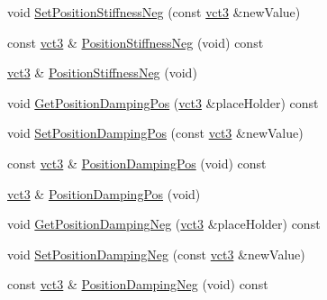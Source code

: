 \begin{DoxyCompactItemize}
\item 
void \hyperlink{classprm_fixture_gain_cartesian_set_af20086c9ad3e9302eee26f8021f1000e}{Set\-Position\-Stiffness\-Neg} (const \hyperlink{vct_fixed_size_vector_types_8h_a3af82acdbf4eeb73c551909240b106ea}{vct3} \&new\-Value)
\item 
const \hyperlink{vct_fixed_size_vector_types_8h_a3af82acdbf4eeb73c551909240b106ea}{vct3} \& \hyperlink{classprm_fixture_gain_cartesian_set_a891d31388bf8192eaac44ceecd5d8030}{Position\-Stiffness\-Neg} (void) const 
\item 
\hyperlink{vct_fixed_size_vector_types_8h_a3af82acdbf4eeb73c551909240b106ea}{vct3} \& \hyperlink{classprm_fixture_gain_cartesian_set_a1986f1b9acb79893d9d21b301fac40cf}{Position\-Stiffness\-Neg} (void)
\item 
void \hyperlink{classprm_fixture_gain_cartesian_set_a810c5926cd3f1d5cdb0fbe14e7c1f055}{Get\-Position\-Damping\-Pos} (\hyperlink{vct_fixed_size_vector_types_8h_a3af82acdbf4eeb73c551909240b106ea}{vct3} \&place\-Holder) const 
\item 
void \hyperlink{classprm_fixture_gain_cartesian_set_a7bf9ae58df70a804536fb37d03e41a5b}{Set\-Position\-Damping\-Pos} (const \hyperlink{vct_fixed_size_vector_types_8h_a3af82acdbf4eeb73c551909240b106ea}{vct3} \&new\-Value)
\item 
const \hyperlink{vct_fixed_size_vector_types_8h_a3af82acdbf4eeb73c551909240b106ea}{vct3} \& \hyperlink{classprm_fixture_gain_cartesian_set_a5f22007d55b6ebe8c7eb206fda12cc2d}{Position\-Damping\-Pos} (void) const 
\item 
\hyperlink{vct_fixed_size_vector_types_8h_a3af82acdbf4eeb73c551909240b106ea}{vct3} \& \hyperlink{classprm_fixture_gain_cartesian_set_a50b28ac97613f8d8d49c47d218c9c6f1}{Position\-Damping\-Pos} (void)
\item 
void \hyperlink{classprm_fixture_gain_cartesian_set_a67085d00946a53c8f7fb878d57f0a901}{Get\-Position\-Damping\-Neg} (\hyperlink{vct_fixed_size_vector_types_8h_a3af82acdbf4eeb73c551909240b106ea}{vct3} \&place\-Holder) const 
\item 
void \hyperlink{classprm_fixture_gain_cartesian_set_a944212c1d502b5c5109b892c9bfdfba3}{Set\-Position\-Damping\-Neg} (const \hyperlink{vct_fixed_size_vector_types_8h_a3af82acdbf4eeb73c551909240b106ea}{vct3} \&new\-Value)
\item 
const \hyperlink{vct_fixed_size_vector_types_8h_a3af82acdbf4eeb73c551909240b106ea}{vct3} \& \hyperlink{classprm_fixture_gain_cartesian_set_a180bc3decd66c8a95d932353473a827f}{Position\-Damping\-Neg} (void) const 

\end{DoxyCompactItemize}
